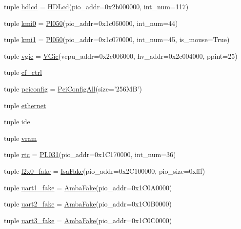 \begin{DoxyCompactItemize}
\item 
tuple \hyperlink{classRealView_1_1VExpress__EMM_a8848fedc605f9c4448e17b5833175525}{hdlcd} = \hyperlink{classRealView_1_1HDLcd}{HDLcd}(pio\_\-addr=0x2b000000, int\_\-num=117)
\item 
tuple \hyperlink{classRealView_1_1VExpress__EMM_a4fcef88eafab200d46609dff412add24}{kmi0} = \hyperlink{classRealView_1_1Pl050}{Pl050}(pio\_\-addr=0x1c060000, int\_\-num=44)
\item 
tuple \hyperlink{classRealView_1_1VExpress__EMM_ad2ff68a98564bfc794ffe30ecd80da6c}{kmi1} = \hyperlink{classRealView_1_1Pl050}{Pl050}(pio\_\-addr=0x1c070000, int\_\-num=45, is\_\-mouse=True)
\item 
tuple \hyperlink{classRealView_1_1VExpress__EMM_a766044c2ee00b062946f8144e20427c5}{vgic} = \hyperlink{classRealView_1_1VGic}{VGic}(vcpu\_\-addr=0x2c006000, hv\_\-addr=0x2c004000, ppint=25)
\item 
tuple \hyperlink{classRealView_1_1VExpress__EMM_a3e7e22e24895378aafbb1c7b707248ae}{cf\_\-ctrl}
\item 
tuple \hyperlink{classRealView_1_1VExpress__EMM_af76b12e7e603a8ef5f908080bb3e6fab}{pciconfig} = \hyperlink{classPciConfigAll}{PciConfigAll}(size='256MB')
\item 
tuple \hyperlink{classRealView_1_1VExpress__EMM_abaa800db2392e16f3bdb03d92660a10c}{ethernet}
\item 
tuple \hyperlink{classRealView_1_1VExpress__EMM_aca6e0ef87c4d6a0425503849acb9d173}{ide}
\item 
tuple \hyperlink{classRealView_1_1VExpress__EMM_a71ad21f3a308e0e8282dc83cf80351eb}{vram}
\item 
tuple \hyperlink{classRealView_1_1VExpress__EMM_a8dc27866c57f35c90dbd18e3d7d154aa}{rtc} = \hyperlink{classRealView_1_1PL031}{PL031}(pio\_\-addr=0x1C170000, int\_\-num=36)
\item 
tuple \hyperlink{classRealView_1_1VExpress__EMM_a58c42fcf23ff778110e667e2df1fbb6f}{l2x0\_\-fake} = \hyperlink{classIsaFake}{IsaFake}(pio\_\-addr=0x2C100000, pio\_\-size=0xfff)
\item 
tuple \hyperlink{classRealView_1_1VExpress__EMM_ae8df5f47228f3c94133173ef497a4203}{uart1\_\-fake} = \hyperlink{classRealView_1_1AmbaFake}{AmbaFake}(pio\_\-addr=0x1C0A0000)
\item 
tuple \hyperlink{classRealView_1_1VExpress__EMM_a0c7e8be915fc7946adb67f2522bf26b1}{uart2\_\-fake} = \hyperlink{classRealView_1_1AmbaFake}{AmbaFake}(pio\_\-addr=0x1C0B0000)
\item 
tuple \hyperlink{classRealView_1_1VExpress__EMM_ac8f4703047b3e05e27410c2c79b2f043}{uart3\_\-fake} = \hyperlink{classRealView_1_1AmbaFake}{AmbaFake}(pio\_\-addr=0x1C0C0000)

\end{DoxyCompactItemize}
